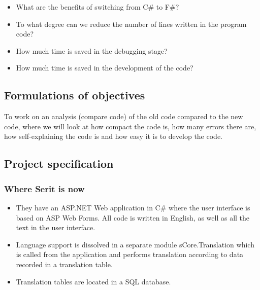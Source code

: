 \documentclass[12pt, a4paper]{article}
\begin{document}
\begin{itemize}
\item What are the benefits of switching from C\# to F\#?
\item To what degree can we reduce the number of lines written in the program code?
\item How much time is saved in the debugging stage?
\item How much time is saved in the development of the code?
\end{itemize}

\newpage

\subsection{Formulations of objectives}
To work on an analysis (compare code) of the old code compared to the new code, where we will look at how compact the code is, how many errors there are, how self-explaining the code is and how easy it is to develop the code.

\newpage
\subsection{Project specification }

\subsubsection{Where Serit is now}

\begin{itemize}
	\item They have an ASP.NET Web application in C\# where the user interface is based on ASP Web Forms. All code is written in English, as well as all the text in the user interface.
	\item Language support is dissolved in a separate module sCore.Translation which is called from the application and performs translation according to data recorded in a translation table.
	\item Translation tables are located in a SQL database.

\end{itemize}
\end{document}
